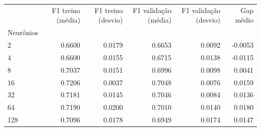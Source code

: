 \begin{tabular}{lrrrrr}
\toprule
 & F1 treino (média) & F1 treino (desvio) & F1 validação (média) & F1 validação (desvio) & Gap médio \\
Neurônios &  &  &  &  &  \\
\midrule
2 & 0.6600 & 0.0179 & 0.6653 & 0.0092 & -0.0053 \\
4 & 0.6600 & 0.0155 & 0.6715 & 0.0138 & -0.0115 \\
8 & 0.7037 & 0.0151 & 0.6996 & 0.0098 & 0.0041 \\
16 & 0.7206 & 0.0037 & 0.7048 & 0.0076 & 0.0159 \\
32 & 0.7181 & 0.0145 & 0.7046 & 0.0084 & 0.0136 \\
64 & 0.7190 & 0.0200 & 0.7010 & 0.0140 & 0.0180 \\
128 & 0.7096 & 0.0178 & 0.6949 & 0.0174 & 0.0147 \\
\bottomrule
\end{tabular}
